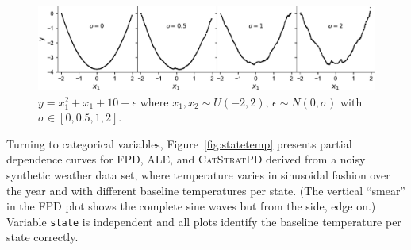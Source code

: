 \documentclass{article}
\newcommand{\figref}[1]{Figure~\ref{#1}}
\newcommand{\cut}[1]{}
\newcommand{\cspd}{\fontfamily{cmr}\textsc{\small CatStratPD}}
\begin{document}
\begin{figure}[htbp]
\begin{center}
\includegraphics[scale=0.45]{images/noise.pdf}
\caption{\small $y = x_1^2 + x_1 + 10 + \epsilon$ where $x_1,x_2 \sim U(-2,2)$, $\epsilon \sim N(0,\sigma)$ with $\sigma \in [0,0.5,1,2]$.}
\label{fig:noise}
\end{center}
\end{figure}

Turning to categorical variables, \figref{fig:statetemp} presents partial dependence curves for FPD, ALE, and \cspd{} derived from a noisy synthetic weather data set, where temperature varies in sinusoidal fashion over the year and with different baseline temperatures per state. (The vertical ``smear'' in the FPD plot shows the complete sine waves but from the side, edge on.)  Variable {\tt\small state} is independent and all plots identify the baseline temperature per state correctly.

\cut{
\begin{equation}\label{eq:weather}
y = t[x_{\it state}] + 10 sin(\frac{2\pi}{365}x_{\it dayofyear}+\pi) + \epsilon, ~~~ \epsilon \sim N(0, 4)
\end{equation}
}
\end{document}
